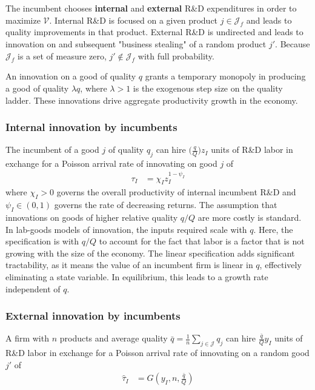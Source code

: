 \documentclass[12pt,english]{article}
\theoremstyle{remark}
\begin{document}
The incumbent chooses \textbf{internal} and \textbf{external} R\&D expenditures in order to maximize $\mathcal{V}$. Internal R\&D is focused on a given product $j \in \mathcal{J}_f$ and leads to quality improvements in that product. External R\&D is undirected and leads to innovation on and subsequent "business stealing" of a random product $j'$. Because $\mathcal{J}_f$ is a set of measure zero, $j' \notin \mathcal{J}_f$ with full probability. 

An innovation on a good of quality $q$ grants a temporary monopoly in producing a good of quality $\lambda q$, where $\lambda > 1$ is the exogenous step size on the quality ladder. These innovations drive aggregate productivity growth in the economy.

\subsubsection{Internal innovation by incumbents}

The incumbent of a good $j$ of quality $q_j$ can hire $\big(\frac{q}{Q}\big)z_I$ units of R\&D labor in exchange for a Poisson arrival rate of innovating on good $j$ of
\begin{align}
\tau_{I} &= \chi_{I} z_{I}^{1-\psi_I}  \label{incumbent_innovation_rate}
\end{align}
where $\chi_I > 0$ governs the overall productivity of internal incumbent R\&D and $\psi_I \in (0,1)$ governs the rate of decreasing returns. The assumption that innovations on goods of higher relative quality $q/Q$ are more costly is standard. In lab-goods models of innovation, the inputs required scale with $q$. Here, the specification is with $q/Q$ to account for the fact that labor is a factor that is not growing with the size of the economy. The linear specification adds significant tractability, as it means the value of an incumbent firm is linear in $q$, effectively eliminating a state variable. In equilibrium, this leads to a growth rate independent of $q$. 

\subsubsection{External innovation by incumbents}

A firm with $n$ products and average quality $\bar{q} = \frac{1}{n}\sum_{j \in \mathcal{J}} q_{j}$ can hire $\frac{\bar{q}}{Q} y_I$ units of R\&D labor in exchange for a Poisson arrival rate of innovating on a random good $j'$ of 
\begin{align}
	\hat{\tau}_I &= G(y_I,n,\frac{\bar{q}}{Q})
\end{align}
\end{document}
